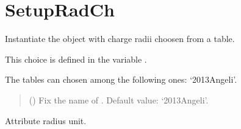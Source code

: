 \documentclass[letterpaper,10pt,english]{sphinxmanual}
\begin{document}
\sphinxstepscope


\section{SetupRadCh}
\label{\detokenize{source/api/setup_rad_ch:setupradch}}\label{\detokenize{source/api/setup_rad_ch::doc}}\label{\detokenize{source/api/setup_rad_ch:module-nucleardatapy.setup_rad_ch}}

\begin{fulllineitems}
\label{\detokenize{source/api/setup_rad_ch:nucleardatapy.setup_rad_ch.SetupRadCh}}
\pysigstartsignatures
\pysiglinewithargsret
{}
{}
{}
\pysigstopsignatures
\sphinxAtStartPar
Instantiate the object with charge radii choosen    from a table.

\sphinxAtStartPar
This choice is defined in the variable .

\sphinxAtStartPar
The tables can chosen among the following ones:    ‘2013\sphinxhyphen{}Angeli’.
\begin{quote}\begin{description}
\sphinxAtStartPar
{} (\sphinxstyleliteralemphasis{\sphinxupquote{, }}) \textendash{} Fix the name of . Default value: ‘2013\sphinxhyphen{}Angeli’.

\end{description}\end{quote}

\sphinxAtStartPar
{}

\begin{fulllineitems}
\label{\detokenize{source/api/setup_rad_ch:nucleardatapy.setup_rad_ch.SetupRadCh.R_unit}}
\pysigstartsignatures
\pysigline
{}
\pysigstopsignatures
\sphinxAtStartPar
Attribute radius unit.


\end{fulllineitems}
\end{fulllineitems}
\end{document}
